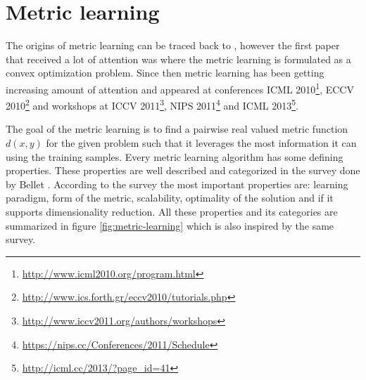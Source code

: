 \documentclass[12pt,a4paper]{report}
\begin{document}
\section{Metric learning} \label{chap:intro:ml}

The origins of metric learning can be traced back to \cite{short1981optimal}, however the first paper that received a lot of attention was \cite{xing2002distance} where the metric learning is formulated as a convex optimization problem. Since then metric learning has been getting increasing amount of attention and appeared at conferences ICML 2010\footnote{\url{http://www.icml2010.org/program.html}}, ECCV 2010\footnote{\url{http://www.ics.forth.gr/eccv2010/tutorials.php}} and workshops at ICCV 2011\footnote{\url{http://www.iccv2011.org/authors/workshops}}, NIPS 2011\footnote{\url{https://nips.cc/Conferences/2011/Schedule}} and ICML 2013\footnote{\url{http://icml.cc/2013/?page_id=41}}.

The goal of the metric learning is to find a pairwise real valued metric function $d(x,y)$ for the given problem such that it leverages the most information it can using the training samples. Every metric learning algorithm has some defining properties. These properties are well described and categorized in the survey done by Bellet \citep{bellet2013survey}. According to the survey the most important properties are: learning paradigm, form of the metric, scalability, optimality of the solution and if it supports dimensionality reduction. All these properties and its categories are summarized in figure \ref{fig:metric-learning} which is also inspired by the same survey.

\end{document}
